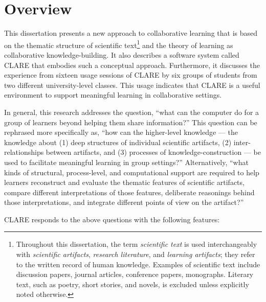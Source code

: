 \chapter{Overview}
\label{sec:overview}

This dissertation presents a new approach to collaborative learning that is
based on the thematic structure of scientific text\footnote{Throughout this
dissertation, the term {\it scientific text\/} is used interchangeably with
{\it scientific artifacts\/}, {\it research literature\/}, and {\it
learning artifacts\/}; they refer to the written record of human
knowledge. Examples of scientific text include discussion papers, journal
articles, conference papers, monographs. Literary text, such as poetry,
short stories, and novels, is excluded unless explicitly noted otherwise.}
and the theory of learning as collaborative knowledge-building. It also
describes a software system called CLARE that embodies such a conceptual
approach. Furthermore, it discusses the experience from sixteen usage
sessions of CLARE by six groups of students from two different
university-level classes. This usage indicates that CLARE is a useful
environment to support meaningful learning in collaborative settings.

In general, this research addresses the question, ``what can the computer
do for a group of learners beyond helping them share information?''  This
question can be rephrased more specifically as, ``how can the higher-level
knowledge --- the knowledge about (1) deep structures of individual
scientific artifacts, (2) inter-relationships between artifacts, and (3)
processes of knowledge-construction --- be used to facilitate meaningful
learning in group settings?'' Alternatively, ``what kinds of structural,
process-level, and computational support are required to help learners
reconstruct and evaluate the thematic features of scientific artifacts,
compare different interpretations of those features, deliberate reasonings
behind those interpretations, and integrate different points of view on the
artifact?''

CLARE responds to the above questions with the following features:

